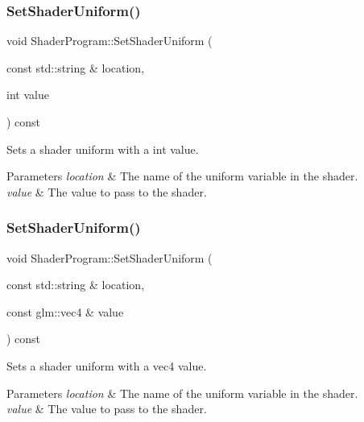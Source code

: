 \subsubsection{\texorpdfstring{Set\+Shader\+Uniform()}{SetShaderUniform()}\hspace{0.1cm}{\footnotesize\ttfamily [3/4]}}
{\footnotesize\ttfamily void Shader\+Program\+::\+Set\+Shader\+Uniform (\begin{DoxyParamCaption}\item[{const std\+::string \&}]{location,  }\item[{int}]{value }\end{DoxyParamCaption}) const}



Sets a shader uniform with a int value.


\begin{DoxyParams}{Parameters}
{\em location} & The name of the uniform variable in the shader. \\
\hline
{\em value} & The value to pass to the shader. \\
\hline
\end{DoxyParams}
\hypertarget{class_shader_program_a5138c3a38a576bbb90d37ab8be6395bf}{}\label{class_shader_program_a5138c3a38a576bbb90d37ab8be6395bf}
\subsubsection{\texorpdfstring{Set\+Shader\+Uniform()}{SetShaderUniform()}\hspace{0.1cm}{\footnotesize\ttfamily [4/4]}}
{\footnotesize\ttfamily void Shader\+Program\+::\+Set\+Shader\+Uniform (\begin{DoxyParamCaption}\item[{const std\+::string \&}]{location,  }\item[{const glm\+::vec4 \&}]{value }\end{DoxyParamCaption}) const}



Sets a shader uniform with a vec4 value.


\begin{DoxyParams}{Parameters}
{\em location} & The name of the uniform variable in the shader. \\
\hline
{\em value} & The value to pass to the shader. \\
\hline
\end{DoxyParams}
\hypertarget{class_shader_program_abefd4e66aae75993f05bd607b6b0ed22}{}\label{class_shader_program_abefd4e66aae75993f05bd607b6b0ed22}
